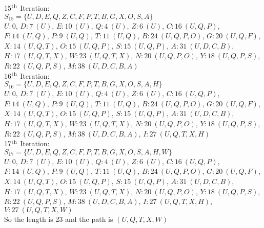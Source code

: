 15$\rm^{th}$ Iteration:\\
$S_{15}=\lbrace U,D,E,Q,Z,C,F,P,T,B,G,X,O,S,A \rbrace$\\
$U:0$, $D:7\ (U)$, $E:10\ (U)$, $Q:4\ (U)$, $Z:6\ (U)$, $C:16\ (U,Q,P)$, $F:14\ (U,Q)$, $P:9\ (U,Q)$, $T:11\ (U,Q)$, $B:24\ (U,Q,P,O)$, $G:20\ (U,Q,F)$, $X:14\ (U,Q,T)$, $O:15\ (U,Q,P)$, $S:15\ (U,Q,P)$, $A:31\ (U,D,C,B)$, $H:17\ (U,Q,T,X)$, $W:23\ (U,Q,T,X)$, $N:20\ (U,Q,P,O)$, $Y:18\ (U,Q,P,S)$, $R:22\ (U,Q,P,S)$, $M:38\ (U,D,C,B,A)$\\

16$\rm^{th}$ Iteration:\\
$S_{16}=\lbrace U,D,E,Q,Z,C,F,P,T,B,G,X,O,S,A,H \rbrace$\\
$U:0$, $D:7\ (U)$, $E:10\ (U)$, $Q:4\ (U)$, $Z:6\ (U)$, $C:16\ (U,Q,P)$, $F:14\ (U,Q)$, $P:9\ (U,Q)$, $T:11\ (U,Q)$, $B:24\ (U,Q,P,O)$, $G:20\ (U,Q,F)$, $X:14\ (U,Q,T)$, $O:15\ (U,Q,P)$, $S:15\ (U,Q,P)$, $A:31\ (U,D,C,B)$, $H:17\ (U,Q,T,X)$, $W:23\ (U,Q,T,X)$, $N:20\ (U,Q,P,O)$, $Y:18\ (U,Q,P,S)$, $R:22\ (U,Q,P,S)$, $M:38\ (U,D,C,B,A)$, $I:27\ (U,Q,T,X,H)$\\

17$\rm^{th}$ Iteration:\\
$S_{17}=\lbrace U,D,E,Q,Z,C,F,P,T,B,G,X,O,S,A,H,W \rbrace$\\
$U:0$, $D:7\ (U)$, $E:10\ (U)$, $Q:4\ (U)$, $Z:6\ (U)$, $C:16\ (U,Q,P)$, $F:14\ (U,Q)$, $P:9\ (U,Q)$, $T:11\ (U,Q)$, $B:24\ (U,Q,P,O)$, $G:20\ (U,Q,F)$, $X:14\ (U,Q,T)$, $O:15\ (U,Q,P)$, $S:15\ (U,Q,P)$, $A:31\ (U,D,C,B)$, $H:17\ (U,Q,T,X)$, $W:23\ (U,Q,T,X)$, $N:20\ (U,Q,P,O)$, $Y:18\ (U,Q,P,S)$, $R:22\ (U,Q,P,S)$, $M:38\ (U,D,C,B,A)$, $I:27\ (U,Q,T,X,H)$, $V:27\ (U,Q,T,X,W)$\\

So the length is 23 and the path is $(U,Q,T,X,W)$\\
